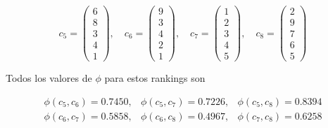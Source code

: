 \begin{ejemplo}
\begin{equation*}
c_5 = \left( \begin{array}{c}
6\\
8\\
3\\
4\\
1
\end{array} \right), \quad
c_6 = \left( \begin{array}{c}
9\\
3\\
4\\
2\\
1
\end{array} \right), \quad
c_7 = \left( \begin{array}{c}
1\\
2\\
3\\
4\\
5
\end{array} \right), \quad
c_8 = \left( \begin{array}{c}
2\\
9\\
7\\
6\\
5
\end{array} \right)
\end{equation*}

Todos los valores de $\phi$ para estos rankings son

\begin{equation*}
\begin{array}{ccc}
\phi(c_5, c_6) = 0.7450, & \phi(c_5, c_7) = 0.7226, & \phi(c_5, c_8) = 0.8394\\
\phi(c_6, c_7) = 0.5858, & \phi(c_6, c_8) = 0.4967, & \phi(c_7, c_8) = 0.6258 
\end{array}
\end{equation*}
\end{ejemplo}